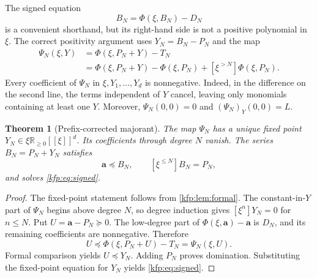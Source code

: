 \documentclass[11pt,a4paper]{article}
\newtheorem{theorem}{Theorem}[section]
\theoremstyle{definition}
\theoremstyle{remark}
\newcommand{\R}{\mathbb R}
\newcommand{\bA}{\boldsymbol a}
\newcommand{\trunc}[2]{[\xi^{\leq #1}]#2}
\newcommand{\tail}[2]{[\xi^{>#1}]#2}
\begin{document}
The signed equation
\begin{equation}\label{kfp:eq:signed}
 B_N=\Phi(\xi,B_N)-D_N
\end{equation}
is a convenient shorthand, but its right-hand side is not a positive
polynomial in $\xi$. The correct positivity argument uses $Y_N=B_N-P_N$
and the map
\begin{equation}\label{kfp:eq:psi}
\begin{split}
 \Psi_N(\xi,Y)
 &=\Phi(\xi,P_N+Y)-T_N\\
 &=\Phi(\xi,P_N+Y)-\Phi(\xi,P_N)
   +\tail{N}{\Phi(\xi,P_N)}.
\end{split}
\end{equation}
Every coefficient of $\Psi_N$ in $\xi,Y_1,\ldots,Y_d$ is nonnegative.
Indeed, in the difference on the second line, the terms independent of $Y$
cancel, leaving only monomials containing at least one $Y$.
Moreover, $\Psi_N(0,0)=0$ and $(\Psi_N)_Y(0,0)=L$.

\begin{theorem}[Prefix-corrected majorant]\label{kfp:thm:majorant}
The map $\Psi_N$ has a unique fixed point
$Y_N\in\xi\R_{\geq0}[[\xi]]^d$. Its coefficients through degree $N$ vanish.
The series $B_N=P_N+Y_N$ satisfies
\[
 \bA\preceq B_N,\qquad
 \trunc{N}{B_N}=P_N,
\]
and solves \eqref{kfp:eq:signed}.
\end{theorem}
\begin{proof}
The fixed-point statement follows from \cref{kfp:lem:formal}. The constant-in-$Y$
part of $\Psi_N$ begins above degree $N$, so degree induction gives
$[\xi^n]Y_N=0$ for $n\leq N$.
Put $U=\bA-P_N\succeq0$. The low-degree part of
$\Phi(\xi,\bA)-\bA$ is $D_N$, and its remaining coefficients are
nonnegative. Therefore
\[
 U\preceq\Phi(\xi,P_N+U)-T_N=\Psi_N(\xi,U).
\]
Formal comparison yields $U\preceq Y_N$. Adding $P_N$ proves domination.
Substituting the fixed-point equation for $Y_N$ yields \eqref{kfp:eq:signed}.
\end{proof}
\end{document}
